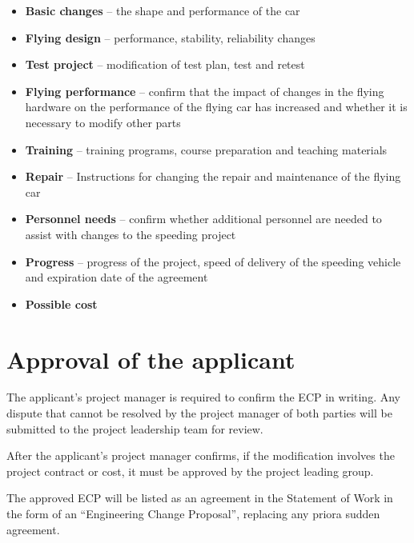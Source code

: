 \begin{itemize}

\item \textbf{Basic changes} -- the shape and performance of the car

\item \textbf{Flying design} -- performance, stability, reliability changes

\item \textbf{Test project} -- modification of test plan, test and retest

\item \textbf{Flying performance} -- confirm that the impact of changes in the flying hardware on the performance of the flying car has increased and whether it is necessary to modify other parts

\item \textbf{Training} -- training programs, course preparation and teaching materials

\item \textbf{Repair} -- Instructions for changing the repair and maintenance of the flying car

\item \textbf{Personnel needs} -- confirm whether additional personnel are needed to assist with changes to the speeding project

\item \textbf{Progress} -- progress of the project, speed of delivery of the speeding vehicle and expiration date of the agreement

\item \textbf{Possible cost}

\end{itemize}

\section{Approval of the applicant}

The applicant's project manager is required to confirm the ECP in writing. Any dispute that cannot be resolved by the project manager of both parties will be submitted to the project leadership team for review.

After the applicant's project manager confirms, if the modification involves the project contract or cost, it must be approved by the project leading group.

The approved ECP will be listed as an agreement in the Statement of Work in the form of an “Engineering Change Proposal”, replacing any priora sudden agreement.

